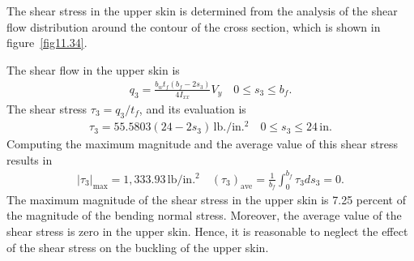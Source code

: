 \documentclass{AeroStructure-ERJohnson}
\begin{document}
\begin{example}
The shear stress in the upper skin is determined from the analysis of the shear flow distribution around the contour of the cross section, which is shown in figure~\ref{fig11.34}.


The shear flow in the upper skin is
\begin{align}
q_{3}=\frac{b_{w} t_{f}\left(b_{f}-2 s_{3}\right)}{4 I_{x x}} V_{y} \quad 0 \leq s_{3} \leq b_{f}. \label{eq11.5.d}\tag{d}
\end{align}
The shear stress $\tau_{3}=q_{3}/t_{f}$, and its evaluation is
\begin{align}
\tau_{3}=55.5803\left(24-2 s_{3}\right)\,\textrm{lb}./\text{in.}^{2} \quad 0 \leq s_{3} \leq 24\,\textrm{in}. \label{eq11.5.e}\tag{e}
\end{align}
Computing the maximum magnitude and the average value of this shear stress results in
\begin{align}
\left|\tau_{3}\right|_{\max}=1{,}333.93\,\textrm{lb}/\text{in.}^{2} \quad\left(\tau_{3}\right)_{\mathrm{ave}}=\frac{1}{b_{f}} \int_{0}^{b_{f}} \tau_{3} d s_{3}=0. \label{eq11.5.f}\tag{f}
\end{align}
The maximum magnitude of the shear stress in the upper skin is 7.25 percent of the magnitude of the bending normal stress. Moreover, the average value of the shear stress is zero in the upper skin. Hence, it is reasonable to neglect the effect of the shear stress on the buckling of the upper skin.


\end{example}
\end{document}
